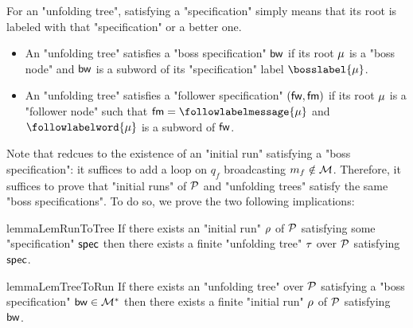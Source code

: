 For an "unfolding tree", satisfying a "specification" simply means that its root is labeled with that "specification" or a better one.

\begin{itemize}
	\item An "unfolding tree" satisfies a "boss specification" $\mathsf{bw}$ if its root $\mu$ is a "boss node" and $\mathsf{bw}$ is a subword of its "specification" label $\bosslabel{\node}$.
	
	\item An "unfolding tree" satisfies a "follower specification" $(\mathsf{fw}, \mathsf{fm})$ if its root $\mu$ is a "follower node" such that $\followmessagespec=\followlabelmessage{\node}$ and  $\followlabelword{\node}$ is a subword of $\mathsf{fw}$.
\end{itemize}

Note that \COVER redcues to the existence of an "initial run" satisfying a "boss specification": it suffices to add a loop on $q_f$ broadcasting $m_f \notin \mathcal{M}$. Therefore, it suffices to prove that "initial runs" of $\mathcal{P}$ and "unfolding trees" satisfy the same "boss specifications". To do so, we prove the two following implications:

\begin{restatable}{lemma}{LemRunToTree}
	\label{lem:run-to-tree}
	If there exists an "initial run" $\rho$ of $\mathcal{P}$ satisfying some "specification" $\mathsf{spec}$ then there exists a finite "unfolding tree" $\tau$ over $\mathcal{P}$ satisfying $\mathsf{spec}$.
\end{restatable}

\begin{restatable}{lemma}{LemTreeToRun}
	\label{lem:tree-to-run}
	If there exists an "unfolding tree" over $\mathcal{P}$ satisfying a "boss specification" $\mathsf{bw} \in \mathcal{M}^*$ then there exists a finite "initial run" $\rho$ of $\mathcal{P}$ satisfying $\mathsf{bw}$.
\end{restatable}



	

